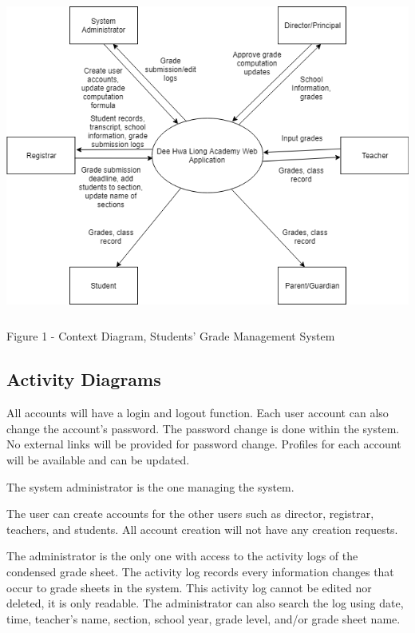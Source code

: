 \documentclass[11pt,a4paper,titlepage]{article}
\begin{document}
\vspace{2cm}
\begin{center}
\includegraphics[height=10.5cm]{Context-Diagram.png}
\end{center}
\vspace{2cm}
\begin{center}
    Figure 1 - Context Diagram, Students' Grade Management System
\end{center}

\newpage
\subsection{Activity Diagrams}

All accounts will have a login and logout function. Each user account can also change the account's password. The password change is done within the system. No external links will be provided for password change. Profiles for each account will be available and can be updated.

The system administrator is the one managing the system.

The user can create accounts for the other users such as director, registrar, teachers, and students. All account creation will not have any creation requests.

The administrator is the only one with access to the activity logs of the condensed grade sheet. The activity log records every information changes that occur to grade sheets in the system. This activity log cannot be edited nor deleted, it is only readable. The administrator can also search the log using date, time, teacher's name, section, school year, grade level, and/or grade sheet name.
\end{document}
